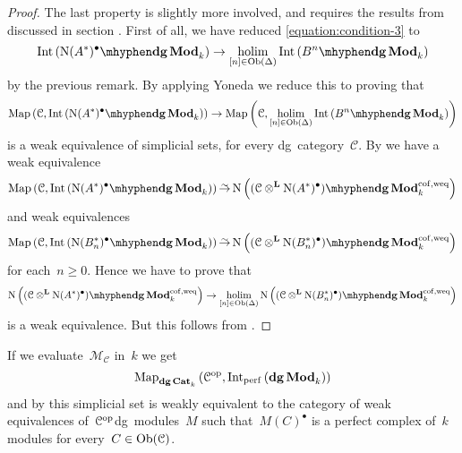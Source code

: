 \begin{refsection}
\begin{theorem}
\begin{proof}[Proof]
    The last property is slightly more involved, and requires the results from \cite{toen} discussed in section \addreference. First of all, we have reduced \eqref{equation:condition-3} to
    \begin{equation}
      \Int\left( \dgMod{\nerve(A^*)^\bullet}_k \right)\to\holim_{[n]\in\Ob(\Delta)}\Int\left( \dgMod{B^n}_k \right)
    \end{equation}
    by the previous remark. By applying Yoneda we reduce this to proving that
    \begin{equation}
      \Map\left( \mathcal{C},\Int\left( \dgMod{\nerve(A^*)^\bullet}_k \right) \right)\to\Map\left( \mathcal{C},\holim_{[n]\in\Ob(\Delta)}\Int\left( \dgMod{B^n}_k \right) \right)
    \end{equation}
    is a weak equivalence of simplicial sets, for every dg~category~$\mathcal{C}$. By \cite[theorem 4.2]{toen} we have a weak equivalence
    \begin{equation}
      \Map\left( \mathcal{C},\Int\left( \dgMod{\nerve(A^*)^\bullet}_k \right) \right)\weq\nerve\left( \dgMod{(\mathcal{C}\otimes^{\mathbf{L}}\nerve(A^*)^\bullet)}_k^{\mathrm{cof,weq}} \right)
    \end{equation}
    and weak equivalences
    \begin{equation}
      \Map\left( \mathcal{C},\Int\left( \dgMod{\nerve(B_n^*)^\bullet}_k \right) \right)\weq\nerve\left( \dgMod{(\mathcal{C}\otimes^{\mathbf{L}}\nerve(B_n^*)^\bullet)}_k^{\mathrm{cof,weq}} \right)
    \end{equation}
    for each~$n\geq 0$. Hence we have to prove that
    \begin{equation}
      \nerve\left( \dgMod{(\mathcal{C}\otimes^{\mathbf{L}}\nerve(A^*)^\bullet)}_k^{\mathrm{cof,weq}} \right)\to\holim_{[n]\in\Ob(\Delta)}\nerve\left( \dgMod{(\mathcal{C}\otimes^{\mathbf{L}}\nerve(B_n^*)^\bullet)}_k^{\mathrm{cof,weq}} \right)
    \end{equation}
    is a weak equivalence. But this follows from \addreference.
  \end{proof}
\end{theorem}

\begin{example}
  If we evaluate~$\mathcal{M}_{\mathcal{C}}$ in~$k$ we get
  \begin{equation}
    \Map_{\dgCat_k}\left( \mathcal{C}^\opp,\Int_\perf\left( \dgMod_k \right) \right)
  \end{equation}
  and by \cite{toen} this simplicial set is weakly equivalent to the category of weak equivalences of~$\mathcal{C}^{\mathrm{op}}$\dash dg~modules~$M$ such that~$M(C)^\bullet$ is a perfect complex of~$k$\dash modules for every~$C\in\operatorname{Ob}(\mathcal{C})$.
\end{example}



\end{refsection}
